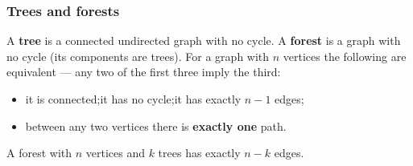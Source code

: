 \subsubsection*{Trees and forests}

\begin{definitionbox}
A \textbf{tree} is a connected undirected graph with no cycle. A \textbf{forest} is a graph with no cycle (its components are trees). For a graph with $n$ vertices the following are equivalent --- any two of the first three imply the third:
\begin{itemize}[leftmargin=*]
    \item it is connected;\quad it has no cycle;\quad it has exactly $n-1$ edges;
    \item between any two vertices there is \textbf{exactly one} path.
\end{itemize}
A forest with $n$ vertices and $k$ trees has exactly $n-k$ edges.
\end{definitionbox}


